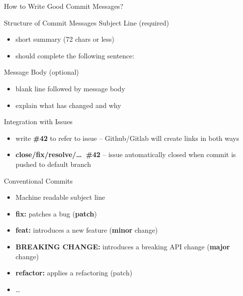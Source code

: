 \begin{frame}{How to Write Good Commit Messages?}
	\begin{fancycolumns}
		\begin{definition}{Structure of Commit Messages }
			Subject Line (required)
			\vspace{-1mm}
			\begin{itemize}
				\item short summary (72 chars or less)
				\item should complete the following sentence:\\
			\end{itemize}
			
			Message Body (optional)
			\vspace{-1mm}
			\begin{itemize}
				\item blank line followed by message body
				\item explain what has changed and why
			\end{itemize}
		\end{definition}
		\vspace{-1mm}
		\begin{note}{Integration with Issues }
			\begin{itemize}
				\item write \textbf{\#42} to refer to issue -- Github/Gitlab will create links in both ways
				\item \textbf{close/fix/resolve/\ldots\ \#42} -- issue automatically closed when commit is pushed to default branch
			\end{itemize}
		\end{note}
		\nextcolumn
		\begin{definition}{Conventional Commits }
			\begin{itemize}
				\item Machine readable subject line
				\item \textbf{fix:} patches a bug (\textbf{patch})
				\item \textbf{feat:} introduces a new feature (\textbf{minor} change)
				\item \textbf{BREAKING CHANGE:} introduces a breaking API change (\textbf{major} change)
				\item \textbf{refactor:} applies a refactoring (patch)
				\item \ldots
			\end{itemize}
		\end{definition}
	\end{fancycolumns}
\end{frame}


